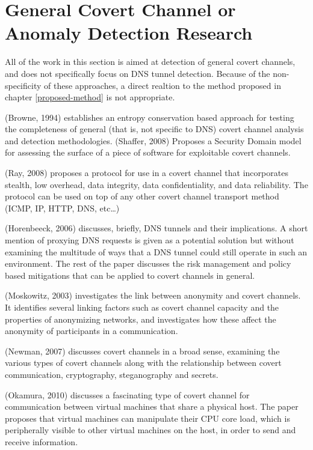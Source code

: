 \documentclass[12pt]{report}
\theoremstyle{remark}
\theoremstyle{definition}
\theoremstyle{definition}
\theoremstyle{definition}
\begin{document}
\section{General Covert Channel or Anomaly Detection Research} All of the work
in this section is aimed at detection of general covert channels, and does not
specifically focus on DNS tunnel detection. Because of the non-specificity of
these approaches, a direct realtion to the method proposed in chapter
\ref{proposed-method} is not appropriate.

(Browne, 1994)\cite{Browne1994} establishes an entropy conservation based
approach for testing the completeness of general (that is, not specific to DNS)
covert channel analysis and detection methodologies. (Shaffer,
2008)\cite{Shaffer2008} Proposes a Security Domain model for assessing the
surface of a piece of software for exploitable covert channels.

(Ray, 2008)\cite{Ray2008} proposes a protocol for use in a covert channel that
incorporates stealth, low overhead, data integrity, data confidentiality, and
data reliability. The protocol can be used on top of any other covert channel
transport method (ICMP, IP, HTTP, DNS, etc\ldots)

(Horenbeeck, 2006)\cite{Horenbeeck2006} discusses, briefly, DNS tunnels and
their implications. A short mention of proxying DNS requests is given as a
potential solution but without examining the multitude of ways that a DNS tunnel
could still operate in such an environment. The rest of the paper discusses the
risk management and policy based mitigations that can be applied to covert
channels in general.

(Moskowitz, 2003)\cite{Moskowitz2003} investigates the link between anonymity
and covert channels. It identifies several linking factors such as covert
channel capacity and the properties of anonymizing networks, and investigates
how these affect the anonymity of participants in a communication.

(Newman, 2007)\cite{Newman2007} discusses covert channels in a broad sense,
examining the various types of covert channels along with the relationship
between covert communication, cryptography, steganography and secrets.

(Okamura, 2010)\cite{Okamura2010} discusses a fascinating type of covert channel
for communication between virtual machines that share a physical host. The paper
proposes that virtual machines can manipulate their CPU core load, which is
peripherally visible to other virtual machines on the host, in order to send and
receive information.
\end{document}
